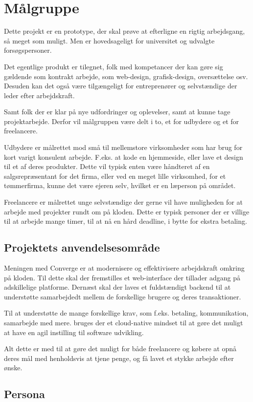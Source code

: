 \chapter{Målgruppe}

Dette projekt er en prototype, der skal prøve at efterligne en rigtig arbejdsgang, så meget som muligt. Men er hovedsageligt for universitet og udvalgte forsøgspersoner.

Det egentlige produkt er tilegnet, folk med kompetancer der kan gøre sig gældende som kontrakt arbejde, som web-design, grafisk-design, oversættelse osv. Desuden kan det også være tilgængeligt for entreprenører og selvstændige der leder efter arbejdskraft.

Samt folk der er klar på nye udfordringer og oplevelser, samt at kunne tage projektarbejde. Derfor vil målgruppen være delt i to, et for udbydere og et for freelancere. 

Udbydere er målrettet mod små til mellemstore virksomheder som har brug for kort varigt konsulent arbejde. F.eks. at kode en hjemmeside, eller lave et design til et af deres produkter. Dette vil typisk enten være håndteret af en salgsrepræsentant for det firma, eller ved en meget lille virksomhed, for et tømmerfirma, kunne det være ejeren selv, hvilket er en læperson på området.

Freelancere er målrettet unge selvstændige der gerne vil have muligheden for at arbejde med projekter rundt om på kloden. Dette er typisk personer der er villige til at arbejde mange timer, til at nå en hård deadline, i bytte for ekstra betaling.

\section{Projektets anvendelsesområde}

Meningen med Converge er at modernisere og effektivisere arbejdskraft omkring på kloden. Til dette skal der fremstilles et web-interface der tillader adgang på adskillelige platforme. Dernæst skal der laves et fuldstændigt backend til at understøtte samarbejdedt mellem de forskellige brugere og deres transaktioner.

Til at understøtte de mange forskellige krav, som f.eks. betaling, kommunikation, samarbejde med mere. bruges der et cloud-native mindset til at gøre det muligt at have en agil instilling til software udvikling.

Alt dette er med til at gøre det muligt for både freelancere og købere at opnå deres mål med henholdsvis at tjene penge, og få lavet et stykke arbejde efter ønske.

\section{Persona}

